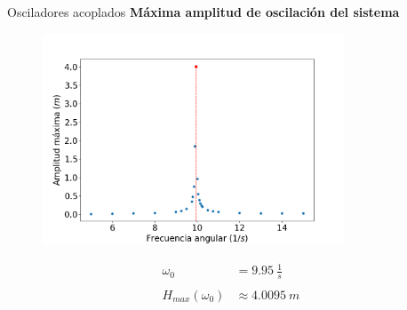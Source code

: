 \begin{frame}{Osciladores acoplados}
    \textbf{Máxima amplitud de oscilación del sistema}
    \begin{minipage}[c]{0.7\linewidth}
        \begin{figure}[H]
            \centering
            \includegraphics[width=0.8\textwidth]{pic/05-results/system_max_amplitude}
            \label{fig:system-max-amplitude}
        \end{figure}
    \end{minipage}
    \begin{minipage}[c]{0.25\linewidth}
        \large{
            \begin{equation*}
                \begin{aligned}
                    \omega_0 &= 9.95\ \frac{1}{s} \\ \\
                    H_{max}(\omega_0) &\approx 4.0095\ m
                \end{aligned}
            \end{equation*}
        }
    \end{minipage}
\end{frame}

